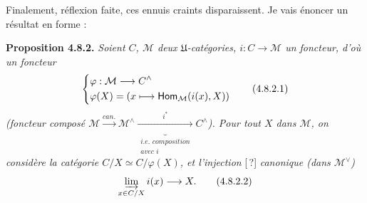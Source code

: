 Finalement, réflexion faite, ces ennuis craints disparaissent. Je vais énoncer un résultat en forme :

\textbf{Proposition 4.8.2.} \textit{Soient $C$, $\mathcal{M}$ deux $\mathfrak{U}$-catégories, $i : C \longrightarrow \mathcal{M}$ un foncteur, d'où un foncteur}
\[ \left\{\begin{aligned}
&\varphi : \mathcal{M} \longrightarrow C^{\wedge}\\
&\varphi(X) = (x \longmapsto \Hom_{\mathcal{M}}(i(x),X))
\end{aligned}\right. \tag*{(4.8.2.1)} \]
\textit{(foncteur composé $\mathcal{M} \xrightarrow{\textit{can.}} \mathcal{M}^{\wedge} \underbrace{\xrightarrow{i^*}}_{\substack{\textit{i.e. composition}\\ \textit{avec } i}} C^{\wedge}$). Pour tout $X$ dans $\mathcal{M}$, on considère la catégorie $C/X \simeq C/\varphi(X)$, et l'injection} [\,?] \textit{canonique (dans $\mathcal{M}^{\vee}$)}
\[ \varinjlim_{x\in C/X} i(x) \longrightarrow X . \tag*{(4.8.2.2)} \]
